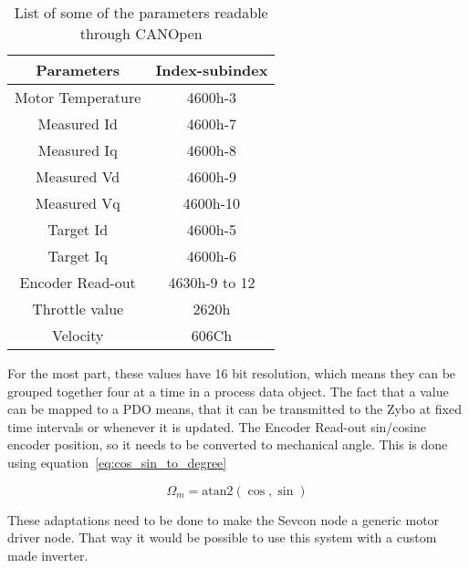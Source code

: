 \begin{table}[h]
	\centering
	\begin{tabular}{| c | c |}
		\hline
		Parameters & Index-subindex \\ %
		\hline
		Motor Temperature & 4600h-3 \\ %
		Measured Id & 4600h-7  \\ %
		Measured Iq & 4600h-8  \\ %
		Measured Vd & 4600h-9  \\ %
		Measured Vq & 4600h-10 \\ %
		Target Id & 4600h-5    \\ %
		Target Iq & 4600h-6    \\ %
		Encoder Read-out & 4630h-9 to 12 \\ %
		Throttle value & 2620h \\ %
		Velocity & 606Ch       \\ %
		\hline	
	\end{tabular}
	\caption{List of some of the parameters readable through CANOpen}
	\label{tab:parameters_of_interest}
\end{table}

For the most part, these values have 16 bit resolution, which means they can be grouped together four at a time in a process data object.
The fact that a value can be mapped to a PDO means, that it can be transmitted to the Zybo at fixed time intervals or whenever it is updated.
The Encoder Read-out sin/cosine encoder position, so it needs to be converted to mechanical angle. 
This is done using equation~\ref{eq:cos_sin_to_degree}

\begin{equation}
\Omega_m = \mathrm{atan2}(\cos,\sin)
\label{eq:cos_sin_to_degree}
\end{equation}

These adaptations need to be done to make the Sevcon node a generic motor driver node.
That way it would be possible to use this system with a custom made inverter.
